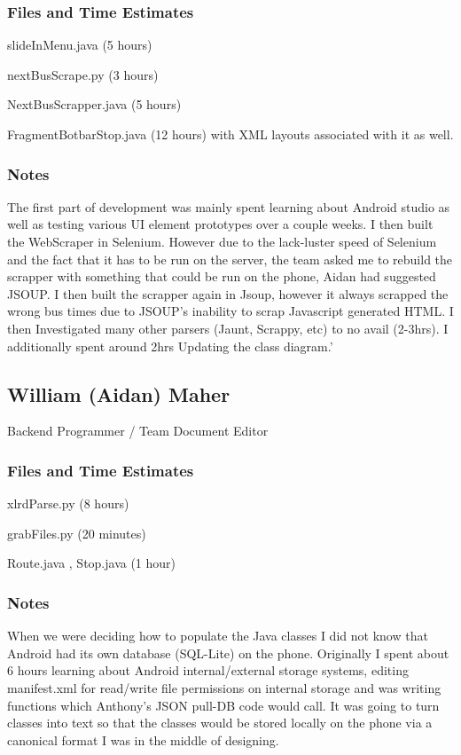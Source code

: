 \documentclass[a4paper,12pt]{article}
\begin{document}
\subsubsection{Files and Time Estimates}

slideInMenu.java (5 hours)

nextBusScrape.py (3 hours)

NextBusScrapper.java (5 hours)

FragmentBotbarStop.java (12 hours) with XML layouts associated with it as well.

\subsubsection{Notes}
The first part of development was mainly spent learning about Android studio as well as testing various UI element prototypes over a couple weeks. I then built the WebScraper in Selenium. However due to the lack-luster speed of Selenium and the fact that it has to be run on the server, the team asked me to rebuild the scrapper with something that could be run on the phone, Aidan had suggested JSOUP. I then built the scrapper again in Jsoup, however it always scrapped the wrong bus times due to JSOUP’s inability to scrap Javascript generated HTML. I then Investigated many other parsers (Jaunt, Scrappy, etc) to no avail (2-3hrs). I additionally spent around 2hrs Updating the class diagram.’

\subsection{William (Aidan) Maher}
Backend Programmer / Team Document Editor

\subsubsection{Files and Time Estimates}
xlrdParse.py (8 hours)

grabFiles.py (20 minutes)

Route.java , Stop.java (1 hour)
\subsubsection{Notes}
When we were deciding how to populate the Java classes I did not know that Android had its own database (SQL-Lite) on the phone. Originally I spent about 6 hours learning about Android internal/external storage systems, editing manifest.xml for read/write file permissions on internal storage and was writing functions which Anthony's JSON pull-DB code would call. It was going to turn classes into text so that the classes would be stored locally on the phone via a canonical format I was in the middle of designing. 
\end{document}
